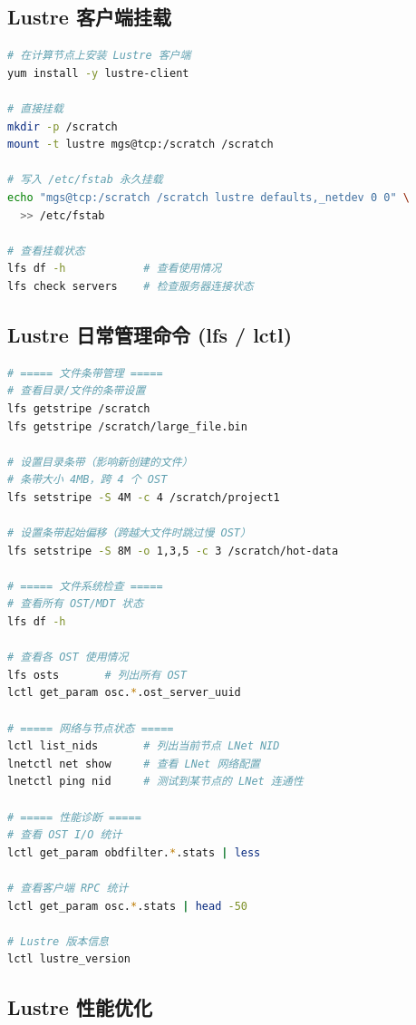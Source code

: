 \documentclass[12pt,UTF8]{ctexbook}
\begin{document}
\subsection{Lustre 客户端挂载}

\begin{lstlisting}[language=bash]
# 在计算节点上安装 Lustre 客户端
yum install -y lustre-client

# 直接挂载
mkdir -p /scratch
mount -t lustre mgs@tcp:/scratch /scratch

# 写入 /etc/fstab 永久挂载
echo "mgs@tcp:/scratch /scratch lustre defaults,_netdev 0 0" \
  >> /etc/fstab

# 查看挂载状态
lfs df -h            # 查看使用情况
lfs check servers    # 检查服务器连接状态
\end{lstlisting}

\subsection{Lustre 日常管理命令 (lfs / lctl)}

\begin{lstlisting}[language=bash]
# ===== 文件条带管理 =====
# 查看目录/文件的条带设置
lfs getstripe /scratch
lfs getstripe /scratch/large_file.bin

# 设置目录条带（影响新创建的文件）
# 条带大小 4MB，跨 4 个 OST
lfs setstripe -S 4M -c 4 /scratch/project1

# 设置条带起始偏移（跨越大文件时跳过慢 OST）
lfs setstripe -S 8M -o 1,3,5 -c 3 /scratch/hot-data

# ===== 文件系统检查 =====
# 查看所有 OST/MDT 状态
lfs df -h

# 查看各 OST 使用情况
lfs osts       # 列出所有 OST
lctl get_param osc.*.ost_server_uuid

# ===== 网络与节点状态 =====
lctl list_nids       # 列出当前节点 LNet NID
lnetctl net show     # 查看 LNet 网络配置
lnetctl ping nid     # 测试到某节点的 LNet 连通性

# ===== 性能诊断 =====
# 查看 OST I/O 统计
lctl get_param obdfilter.*.stats | less

# 查看客户端 RPC 统计
lctl get_param osc.*.stats | head -50

# Lustre 版本信息
lctl lustre_version
\end{lstlisting}

\subsection{Lustre 性能优化}
\end{document}
